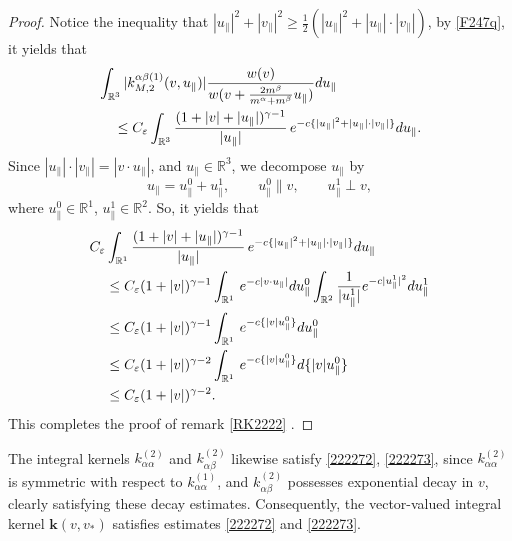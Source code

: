 \documentclass[reqno]{amsart}
\numberwithin{equation}{section}
\numberwithin{equation}{section}
\begin{document}
\begin{proof}
	Notice the inequality that  $|u_{\parallel}|^2+|v_{\parallel}|^2 \geq \frac{1}{2} (|u_{\parallel}|^2+|u_{\parallel}|\cdot|v_{\parallel}|)$, by \eqref{F247q}, it yields that
	\begin{align*}
		&\int_{\mathbb{R}^3}|k_{M,2}^{\alpha \beta(1)}(v,u_{\parallel})|\frac{w(v)}{w(v+\frac{2m^{\beta}}{m^{\alpha}+m^{\beta}}u_{\parallel})} d u_{\parallel} \\
		&\hspace{0.4cm}\leq C_{\varepsilon} \int_{\mathbb{R}^3}\frac{(1+|v|+|u_{\parallel}|)^{\gamma-1}}{|u_{\parallel}|} \, e^{-c\{|u_{\parallel}|^2+|u_{\parallel}|\cdot|v_{\parallel}|\}} d u_{\parallel}.
	\end{align*}
	Since $|u_{\parallel}|\cdot|v_{\parallel}|=|v\cdot u_{\parallel}|$, and $u_{\parallel}\in \mathbb{R}^3$, we decompose $u_{\parallel}$ by
	\begin{equation*}
		u_{\parallel}=u^{0}_{\parallel}+u^{1}_{\parallel},\qquad  u^{0}_{\parallel} \parallel v, \qquad u^{1}_{\parallel} \perp v,
	\end{equation*}
	where $u^{0}_{\parallel}\in\mathbb{R}^1$, $u^{1}_{\parallel}\in\mathbb{R}^2$. So, it yields that
	\begin{align}
		&C_{\varepsilon} \int_{\mathbb{R}^1}\frac{(1+|v|+|u_{\parallel}|)^{\gamma-1}}{|u_{\parallel}|} \, e^{-c\{|u_{\parallel}|^2+|u_{\parallel}|\cdot|v_{\parallel}|\}} d u_{\parallel} \notag\\
		&\hspace{0.4cm}\leq C_{\varepsilon}(1+|v|)^{\gamma-1} \int_{\mathbb{R}^1} \, e^{-c|v\cdot u_{\parallel}|} d u^0_{\parallel}\int_{\mathbb{R}^2} \frac{1}{|u^1_{\parallel}|}e^{-c|u^1_{\parallel}|^2}d u^1_{\parallel}\notag\\
		&\hspace{0.4cm}\leq C_{\varepsilon}(1+|v|)^{\gamma-1} \int_{\mathbb{R}^1} \, e^{-c\{|v| u^0_{\parallel}\}} d u^0_{\parallel}\notag\\
		&\hspace{0.4cm}\leq C_{\varepsilon}(1+|v|)^{\gamma-2} \int_{\mathbb{R}^1} \, e^{-c\{|v| u^0_{\parallel}\}} d \{|v|u^0_{\parallel}\}\notag\\
		&\hspace{0.4cm} \leq C_{\varepsilon}(1+|v|)^{\gamma-2}.\label{lstintg270}
	\end{align}
	This completes the proof of remark \ref{RK2222} .
	\end{proof}
	The integral kernels $k_{\alpha \alpha}^{(2)}$ and $k_{\alpha \beta}^{(2)}$ likewise satisfy \eqref{222272}, \eqref{222273}, since $k_{\alpha \alpha}^{(2)}$ is symmetric with respect to $k_{\alpha \alpha}^{(1)}$, and $k_{\alpha \beta}^{(2)}$ possesses exponential decay in $v$, clearly satisfying these decay estimates. Consequently, the vector-valued integral kernel $\bm{k}(v,v_*)$ satisfies estimates \eqref{222272} and \eqref{222273}.
	
\end{document}
